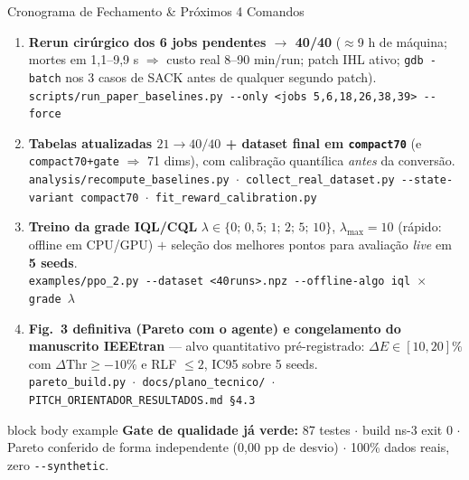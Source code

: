 \documentclass[aspectratio=169,10pt,xcolor={dvipsnames,table}]{beamer}
\newcommand{\datapath}[1]{{\scriptsize\color{darkgray}\texttt{#1}}}
\begin{document}
\begin{frame}{Cronograma de Fechamento \& Pr\'oximos 4 Comandos}
  \begin{enumerate}
    \item \textbf{Rerun cirúrgico dos 6 jobs pendentes $\to$ 40/40}
      ($\approx$9 h de máquina; mortes em 1,1--9,9 s $\Rightarrow$ custo real
      8--90 min/run; patch IHL ativo; \texttt{gdb -batch} nos 3 casos de
      SACK antes de qualquer segundo patch).\\
      \datapath{scripts/run\_paper\_baselines.py -{}-only <jobs 5,6,18,26,38,39> -{}-force}
    \item \textbf{Tabelas atualizadas $21 \to 40/40$ + dataset final em
      \texttt{compact70}} (e \texttt{compact70+gate} $\Rightarrow$ 71 dims),
      com calibração quantílica \emph{antes} da conversão.\\
      \datapath{analysis/recompute\_baselines.py $\cdot$ collect\_real\_dataset.py
      -{}-state-variant compact70 $\cdot$ fit\_reward\_calibration.py}
    \item \textbf{Treino da grade IQL/CQL} $\lambda \in \{0;\,0{,}5;\,1;\,2;\,5;\,10\}$,
      $\lambda_{\max}=10$ (rápido: offline em CPU/GPU) $+$ seleção dos melhores
      pontos para avaliação \emph{live} em \textbf{5 seeds}.\\
      \datapath{examples/ppo\_2.py -{}-dataset <40runs>.npz -{}-offline-algo iql
      $\times$ grade $\lambda$}
    \item \textbf{Fig.\ 3 definitiva (Pareto com o agente) e congelamento do
      manuscrito IEEEtran} --- alvo quantitativo pré-registrado:
      $\Delta E \in [10,20]\%$ com $\Delta\text{Thr} \ge -10\%$ e
      RLF $\le 2$, IC95 sobre 5 seeds.\\
      \datapath{pareto\_build.py $\cdot$ docs/plano\_tecnico/ $\cdot$
      PITCH\_ORIENTADOR\_RESULTADOS.md \S4.3}
  \end{enumerate}
  \vspace{1mm}
  \begin{beamercolorbox}[wd=\textwidth,sep=2pt]{block body example}
    \small \textbf{Gate de qualidade já verde:} 87 testes $\cdot$ build ns-3
    exit 0 $\cdot$ Pareto conferido de forma independente (0,00 pp de
    desvio) $\cdot$ 100\% dados reais, zero \texttt{-{}-synthetic}.
  \end{beamercolorbox}
\end{frame}
\end{document}

